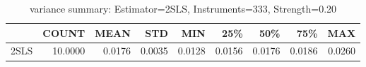 \begin{table}[ht]
\centering
\caption{variance summary: Estimator=2SLS, Instruments=333, Strength=0.20}
\begin{tabular}{lrrrrrrrr}
\toprule
 & COUNT & MEAN & STD & MIN & 25\% & 50\% & 75\% & MAX \\
\midrule
2SLS & 10.0000 & 0.0176 & 0.0035 & 0.0128 & 0.0156 & 0.0176 & 0.0186 & 0.0260 \\
\bottomrule
\end{tabular}
\end{table}
